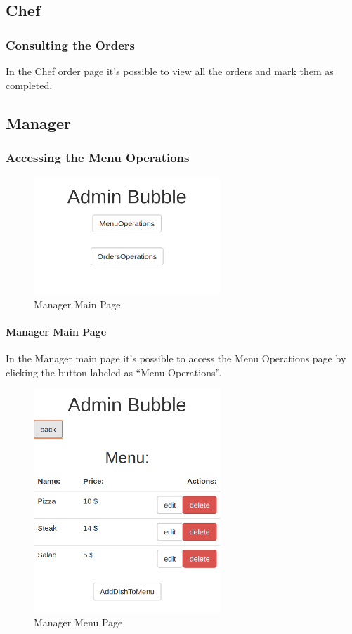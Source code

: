 \subsection{Chef}
\subsubsection{Consulting the Orders}
In the Chef order page it's possible to view all the orders and mark them as completed.

\subsection{Manager}
\subsubsection{Accessing the Menu Operations}
\begin{figure}[H]
	\centering
	\includegraphics[width=7cm]{../../documenti/UserManualDemo/demo_screens/admin_main.png}
	\caption{Manager Main Page}
\end{figure}
\paragraph{Manager Main Page}
In the Manager main page it's possible to access the Menu Operations page by clicking the button labeled as ``Menu Operations''.

\begin{figure}[H]
	\centering
	\includegraphics[width=7cm]{../../documenti/UserManualDemo/demo_screens/admin_menu.png}
	\caption{Manager Menu Page}
\end{figure}
